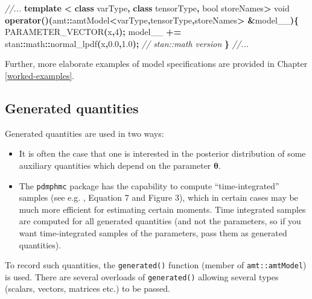 \documentclass[
]{book}
\newenvironment{Shaded}{\begin{snugshade}}{\end{snugshade}}
\newcommand{\CommentTok}[1]{\textcolor[rgb]{0.56,0.35,0.01}{\textit{#1}}}
\newcommand{\DataTypeTok}[1]{\textcolor[rgb]{0.13,0.29,0.53}{#1}}
\newcommand{\DecValTok}[1]{\textcolor[rgb]{0.00,0.00,0.81}{#1}}
\newcommand{\FloatTok}[1]{\textcolor[rgb]{0.00,0.00,0.81}{#1}}
\newcommand{\KeywordTok}[1]{\textcolor[rgb]{0.13,0.29,0.53}{\textbf{#1}}}
\newcommand{\NormalTok}[1]{#1}
\newcommand{\OperatorTok}[1]{\textcolor[rgb]{0.81,0.36,0.00}{\textbf{#1}}}
\begin{document}
\begin{Shaded}
\begin{Highlighting}[]
\CommentTok{//...}
  \KeywordTok{template} \OperatorTok{\textless{}} \KeywordTok{class}\NormalTok{ varType}\OperatorTok{,} \KeywordTok{class}\NormalTok{ tensorType}\OperatorTok{,} \DataTypeTok{bool}\NormalTok{ storeNames}\OperatorTok{\textgreater{}}
  \DataTypeTok{void} \KeywordTok{operator}\OperatorTok{()(}\NormalTok{amt}\OperatorTok{::}\NormalTok{amtModel}\OperatorTok{\textless{}}\NormalTok{varType}\OperatorTok{,}\NormalTok{tensorType}\OperatorTok{,}\NormalTok{storeNames}\OperatorTok{\textgreater{}} \OperatorTok{\&}\NormalTok{model\_\_}\OperatorTok{)\{}
\NormalTok{    PARAMETER\_VECTOR}\OperatorTok{(}\NormalTok{x}\OperatorTok{,}\DecValTok{4}\OperatorTok{);}
\NormalTok{    model\_\_ }\OperatorTok{+=}\NormalTok{ stan}\OperatorTok{::}\NormalTok{math}\OperatorTok{::}\NormalTok{normal\_lpdf}\OperatorTok{(}\NormalTok{x}\OperatorTok{,}\FloatTok{0.0}\OperatorTok{,}\FloatTok{1.0}\OperatorTok{);} \CommentTok{// stan::math version}
  \OperatorTok{\}}
\CommentTok{//...}
\end{Highlighting}
\end{Shaded}

Further, more elaborate examples of model specifications are provided in Chapter \ref{worked-examples}.

\hypertarget{generated-quantities}{%
\subsection{Generated quantities}\label{generated-quantities}}

Generated quantities are used in two ways:

\begin{itemize}
\item
  It is often the case that one is interested in the posterior distribution of some auxiliary quantities which depend on the parameter \(\boldsymbol \theta\).
\item
  The \texttt{pdmphmc} package has the capability to compute ``time-integrated'' samples (see e.g. \citet{kleppe_CTHMC}, Equation 7 and Figure 3), which in certain cases may be much more efficient for estimating certain moments. Time integrated samples are computed for all generated quantities (and not the parameters, so if you want time-integrated samples of the parameters, pass them as generated quantities).
\end{itemize}

To record such quantities, the \texttt{generated()} function (member of \texttt{amt::amtModel}) is used. There are several overloads of \texttt{generated()} allowing several types (scalars, vectors, matrices etc.) to be passed.
\end{document}
